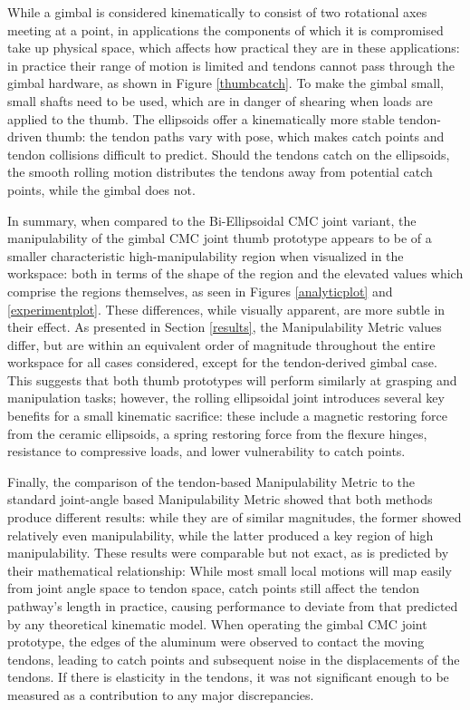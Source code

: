 \documentclass[journal]{IEEEtran}
\begin{document}
While a gimbal is considered kinematically to consist of two rotational axes meeting at a point, in applications the components of which it is compromised take up physical space, which affects how practical they are in these applications: in practice their range of motion is limited and tendons cannot pass through the gimbal hardware, as shown in Figure \ref{thumbcatch}. To make the gimbal small, small shafts need to be used, which are in danger of shearing when loads are applied to the thumb. The ellipsoids offer a kinematically more stable tendon-driven thumb: the tendon paths vary with pose, which makes catch points and tendon collisions difficult to predict. Should the tendons catch on the ellipsoids, the smooth rolling motion distributes the tendons away from potential catch points, while the gimbal does not.

In summary, when compared to the Bi-Ellipsoidal CMC joint variant, the manipulability of the gimbal CMC joint thumb prototype appears to be of a smaller characteristic high-manipulability region when visualized in the workspace: both in terms of the shape of the region and the elevated values which comprise the regions themselves, as seen in Figures \ref{analyticplot} and \ref{experimentplot}. These differences, while visually apparent, are more subtle in their effect. As presented in Section \ref{results}, the Manipulability Metric values differ, but are within an equivalent order of magnitude throughout the entire workspace for all cases considered, except for the tendon-derived gimbal case. This suggests that both thumb prototypes will perform similarly at grasping and manipulation tasks; however, the rolling ellipsoidal joint introduces several key benefits for a small kinematic sacrifice: these include a magnetic restoring force from the ceramic ellipsoids, a spring restoring force from the flexure hinges, resistance to compressive loads, and lower vulnerability to catch points.

Finally, the comparison of the tendon-based Manipulability Metric to the standard joint-angle based Manipulability Metric showed that both methods produce different results: while they are of similar magnitudes, the former showed relatively even manipulability, while the latter produced a key region of high manipulability. These results were comparable but not exact, as is predicted by their mathematical relationship: While most small local motions will map easily from joint angle space to tendon space, catch points still affect the tendon pathway's length in practice, causing performance to deviate from that predicted by any theoretical kinematic model. When operating the gimbal CMC joint prototype, the edges of the aluminum were observed to contact the moving tendons, leading to catch points and subsequent noise in the displacements of the tendons. If there is elasticity in the tendons, it was not significant enough to be measured as a contribution to any major discrepancies. 
\end{document}
